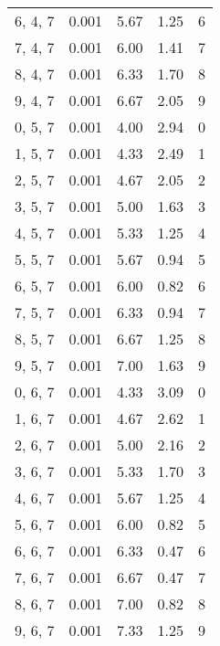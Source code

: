 \documentclass[12pt]{article}
\begin{document}
\begin{tabular}{c || c || c | c | c}
6, 4, 7 & 0.001 & 5.67 & 1.25 & 6 \\
7, 4, 7 & 0.001 & 6.00 & 1.41 & 7 \\
8, 4, 7 & 0.001 & 6.33 & 1.70 & 8 \\
9, 4, 7 & 0.001 & 6.67 & 2.05 & 9 \\
0, 5, 7 & 0.001 & 4.00 & 2.94 & 0 \\
1, 5, 7 & 0.001 & 4.33 & 2.49 & 1 \\
2, 5, 7 & 0.001 & 4.67 & 2.05 & 2 \\
3, 5, 7 & 0.001 & 5.00 & 1.63 & 3 \\
4, 5, 7 & 0.001 & 5.33 & 1.25 & 4 \\
5, 5, 7 & 0.001 & 5.67 & 0.94 & 5 \\
6, 5, 7 & 0.001 & 6.00 & 0.82 & 6 \\
7, 5, 7 & 0.001 & 6.33 & 0.94 & 7 \\
8, 5, 7 & 0.001 & 6.67 & 1.25 & 8 \\
9, 5, 7 & 0.001 & 7.00 & 1.63 & 9 \\
0, 6, 7 & 0.001 & 4.33 & 3.09 & 0 \\
1, 6, 7 & 0.001 & 4.67 & 2.62 & 1 \\
2, 6, 7 & 0.001 & 5.00 & 2.16 & 2 \\
3, 6, 7 & 0.001 & 5.33 & 1.70 & 3 \\
4, 6, 7 & 0.001 & 5.67 & 1.25 & 4 \\
5, 6, 7 & 0.001 & 6.00 & 0.82 & 5 \\
6, 6, 7 & 0.001 & 6.33 & 0.47 & 6 \\
7, 6, 7 & 0.001 & 6.67 & 0.47 & 7 \\
8, 6, 7 & 0.001 & 7.00 & 0.82 & 8 \\
9, 6, 7 & 0.001 & 7.33 & 1.25 & 9 \\
0, 7, 7 & 0.001 & 4.67 & 3.30 & 7 \\
1, 7, 7 & 0.001 & 5.00 & 2.83 & 7 \\
2, 7, 7 & 0.001 & 5.33 & 2.36 & 7 \\
3, 7, 7 & 0.001 & 5.67 & 1.89 & 7 \\
4, 7, 7 & 0.001 & 6.00 & 1.41 & 7 \\
5, 7, 7 & 0.001 & 6.33 & 0.94 & 7 \\
6, 7, 7 & 0.001 & 6.67 & 0.47 & 7 \\
7, 7, 7 & 0.001 & 7.00 & 0.00 & 7 \\
8, 7, 7 & 0.001 & 7.33 & 0.47 & 7 \\
9, 7, 7 & 0.001 & 7.67 & 0.94 & 7 \\

\end{tabular}
\end{document}
